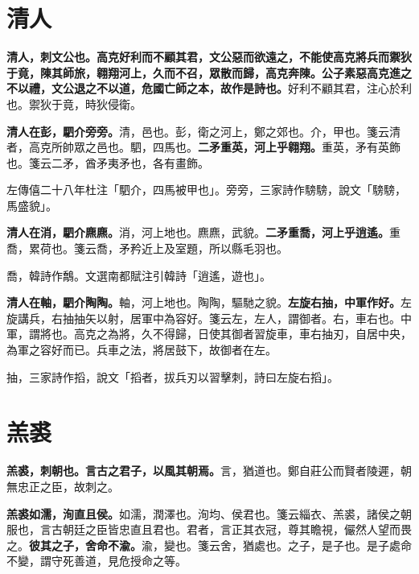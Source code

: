 \section{清人}


\textbf{清人，刺文公也。高克好利而不顧其君，文公惡而欲遠之，不能使高克將兵而禦狄于竟，陳其師旅，翱翔河上，久而不召，眾散而歸，高克奔陳。公子素惡高克進之不以禮，文公退之不以道，危國亡師之本，故作是詩也。}{\footnotesize 好利不顧其君，注心於利也。禦狄于竟，時狄侵衛。}

\textbf{清人在彭，駟介旁旁。}{\footnotesize 清，邑也。彭，衛之河上，鄭之郊也。介，甲也。箋云清者，高克所帥眾之邑也。駟，四馬也。}\textbf{二矛重英，河上乎翱翔。}{\footnotesize 重英，矛有英飾也。箋云二矛，酋矛夷矛也，各有畫飾。}

\begin{quoting}左傳僖二十八年杜注「駟介，四馬被甲也」。旁旁，三家詩作騯騯，說文「騯騯，馬盛貌」。\end{quoting}

\textbf{清人在消，駟介麃麃。}{\footnotesize 消，河上地也。麃麃，武貌。}\textbf{二矛重喬，河上乎逍遙。}{\footnotesize 重喬，累荷也。箋云喬，矛矜近上及室題，所以縣毛羽也。}

\begin{quoting}喬，韓詩作鷮。文選南都賦注引韓詩「逍遙，遊也」。\end{quoting}

\textbf{清人在軸，駟介陶陶。}{\footnotesize 軸，河上地也。陶陶，驅馳之貌。}\textbf{左旋右抽，中軍作好。}{\footnotesize 左旋講兵，右抽抽矢以射，居軍中為容好。箋云左，左人，謂御者。右，車右也。中軍，謂將也。高克之為將，久不得歸，日使其御者習旋車，車右抽刃，自居中央，為軍之容好而已。兵車之法，將居鼓下，故御者在左。}

\begin{quoting}抽，三家詩作搯，說文「搯者，拔兵刃以習擊刺，詩曰左旋右搯」。\end{quoting}

\section{羔裘}


\textbf{羔裘，刺朝也。言古之君子，以風其朝焉。}{\footnotesize 言，猶道也。鄭自莊公而賢者陵遲，朝無忠正之臣，故刺之。}

\textbf{羔裘如濡，洵直且侯。}{\footnotesize 如濡，潤澤也。洵均、侯君也。箋云緇衣、羔裘，諸侯之朝服也，言古朝廷之臣皆忠直且君也。君者，言正其衣冠，尊其瞻視，儼然人望而畏之。}\textbf{彼其之子，舍命不渝。}{\footnotesize 渝，變也。箋云舍，猶處也。之子，是子也。是子處命不變，謂守死善道，見危授命之等。}

